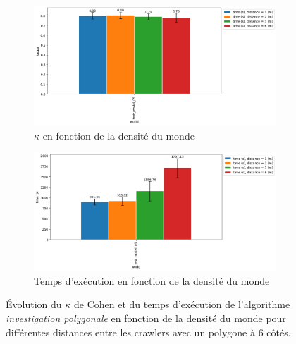 \documentclass[english,RandD]{rapportPFE}  %
\begin{document}
			\begin{figure}[h!]
				\begin{subfigure}[t]{0.9\linewidth}
					\includegraphics[width=\linewidth]{graphics/investigation_polygonale-kappa_vs_world_for_each_d_k1_n2_p6.png}
					\caption{$\kappa$ en fonction de la densité du monde}
					\label{fig:investigation_polygonale-kappa_vs_world_for_each_d_k1_n2_p6}
				\end{subfigure}
				\hfill
				\begin{subfigure}[t]{0.9\linewidth}
						\includegraphics[width=\linewidth]{graphics/investigation_polygonale-time_vs_world_for_each_d_k1_n2_p6.png}
						\caption{Temps d'exécution en fonction de la densité du monde}
						\label{fig:investigation_polygonale-time_vs_world_for_each_d_k1_n2_p6}
				\end{subfigure}
				\caption{Évolution du $\kappa$ de Cohen et du temps d'exécution de l'algorithme \textit{investigation polygonale} en fonction de la densité du monde pour différentes distances entre les crawlers avec un polygone à 6 côtés.}
				\label{fig:investigation_polygonale-world_for_each_d_k1_n2_p6}
			\end{figure}
\end{document}
